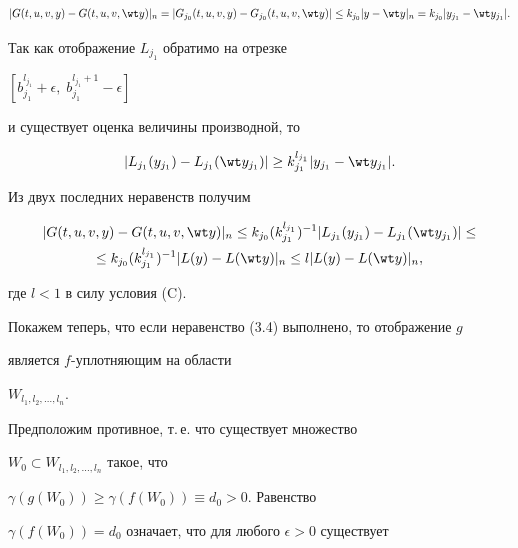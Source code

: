 \begin{pf}
\begin{pf}
$$


|G(t,u,v,y)-G(t,u,v,\wt y)|_n=|G_{j_0}(t,u,v,y)-


G_{j_0}(t,u,v,\wt y)|\leq 


k_{j_0} |y-\wt y|_n = 


k_{j_0} |y_{j_1} - \wt y_{j_1}|.


$$


Так как отображение $L_{j_1}$ обратимо на отрезке 


$[b_{j_1}^{l_{j_1}}+\epsilon,\; b_{j_1}^{l_{j_1}+1}-\epsilon]$


и существует оценка величины производной, то


$$


|L_{j_1}(y_{j_1})-L_{j_1}(\wt y_{j_1})|\geq k_{j_1}^{l_{j_1}}


|y_{j_1}-\wt y_{j_1}|.


$$


Из двух последних неравенств получим


\begin{multline}


|G(t,u,v,y)-G(t,u,v,\wt y)|_n\leq 


k_{j_0}(k_{j_1}^{l_{j_1}})^{-1} |L_{j_1}(y_{j_1}) - L_{j_1}


(\wt y_{j_1})|\leq \\


%


\leq k_{j_0}(k_{j_1}^{l_{j_1}})^{-1} |L(y)- L(\wt y)|_n\leq


l|L(y) - L(\wt y)|_n,


\end{multline}


где $l<1$ в силу условия (C).





Покажем теперь, что если неравенство (3.4) выполнено, то отображение $g$


является $f$-уплотняющим на области 


$W_{l_1, l_2, \dotsc, l_n}$. 





Предположим противное, т.\,е. что существует множество


$W_0\subset W_{l_1, l_2, \dotsc, l_n}$ такое, что 


$\gamma (g(W_0))\geq \gamma (f(W_0))\equiv d_0 >0$. Равенство


$\gamma (f(W_0))= d_0$ означает, что для любого $\epsilon >0$ существует 



\end{pf}
\end{pf}
